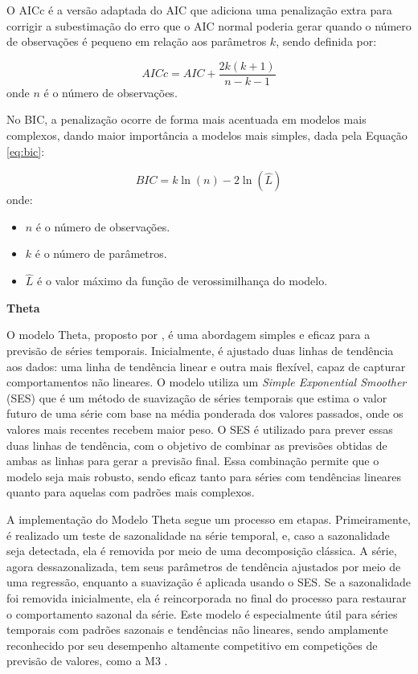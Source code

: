 O AICc é a versão adaptada do AIC que adiciona uma penalização extra para corrigir a subestimação do erro que o AIC normal poderia gerar quando o número de observações é pequeno em relação aos parâmetros \( k \), sendo definida por:

\begin{equation}
AICc = AIC + \frac{2k(k+1)}{n-k-1}
\end{equation}
onde \( n \) é o número de observações.

No BIC, a penalização ocorre de forma mais acentuada em modelos mais complexos, dando maior importância a modelos mais simples, dada pela Equação \eqref{eq:bic}:


\begin{equation}
BIC = k\ln(n) - 2\ln(\hat{L})
\label{eq:bic}
\end{equation}
onde:
\begin{itemize}
    \item \( n \) é o número de observações.
    \item \( k \) é o número de parâmetros.
    \item \( \hat{L} \) é o valor máximo da função de verossimilhança do modelo.
\end{itemize}


\textbf{Theta}

O modelo Theta, proposto por \cite{theta_model}, é uma abordagem simples e eficaz para a previsão de séries temporais. Inicialmente, é ajustado duas linhas de tendência aos dados: uma linha de tendência linear e outra mais flexível, capaz de capturar comportamentos não lineares. O modelo utiliza um \textit{Simple Exponential Smoother} (SES) que é um método de suavização de séries temporais que estima o valor futuro de uma série com base na média ponderada dos valores passados, onde os valores mais recentes recebem maior peso.
O SES é utilizado para prever essas duas linhas de tendência, com o objetivo de combinar as previsões obtidas de ambas as linhas para gerar a previsão final. Essa combinação permite que o modelo seja mais robusto, sendo eficaz tanto para séries com tendências lineares quanto para aquelas com padrões mais complexos.

A implementação do Modelo Theta segue um processo em etapas. Primeiramente, é realizado um teste de sazonalidade na série temporal, e, caso a sazonalidade seja detectada, ela é removida por meio de uma decomposição clássica. A série, agora dessazonalizada, tem seus parâmetros de tendência ajustados por meio de uma regressão, enquanto a suavização é aplicada usando o SES. Se a sazonalidade foi removida inicialmente, ela é reincorporada no final do processo para restaurar o comportamento sazonal da série. Este modelo é especialmente útil para séries temporais com padrões sazonais e tendências não lineares, sendo amplamente reconhecido por seu desempenho altamente competitivo em competições de previsão de valores, como a M3 \citep{makridakis2000m3}.


